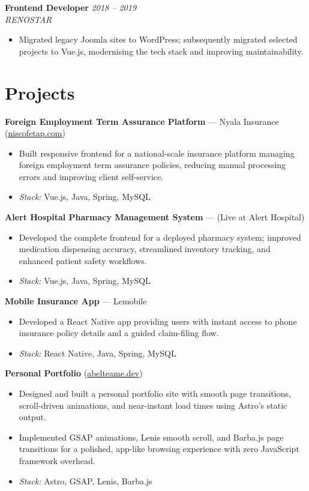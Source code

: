 \documentclass[10pt,a4paper]{article}
\begin{document}
\vspace{8pt}
\textbf{Frontend Developer} \hfill \textit{2018 -- 2019}\\
\textit{RENOSTAR}
\begin{itemize}
  \item Migrated legacy Joomla sites to WordPress; subsequently migrated selected projects to
        Vue.js, modernising the tech stack and improving maintainability.
\end{itemize}

\section{Projects}

\textbf{Foreign Employment Term Assurance Platform} --- Nyala Insurance
(\href{https://niscofetap.com}{niscofetap.com})
\begin{itemize}
  \item Built responsive frontend for a national-scale insurance platform managing foreign employment
        term assurance policies, reducing manual processing errors and improving client self-service.
  \item \textit{Stack:} Vue.js, Java, Spring, MySQL
\end{itemize}

\vspace{4pt}
\textbf{Alert Hospital Pharmacy Management System} --- (Live at Alert Hospital)
\begin{itemize}
  \item Developed the complete frontend for a deployed pharmacy system; improved medication dispensing
        accuracy, streamlined inventory tracking, and enhanced patient safety workflows.
  \item \textit{Stack:} Vue.js, Java, Spring, MySQL
\end{itemize}

\vspace{4pt}
\textbf{Mobile Insurance App} --- Lemobile
\begin{itemize}
  \item Developed a React Native app providing users with instant access to phone insurance policy
        details and a guided claim-filing flow.
  \item \textit{Stack:} React Native, Java, Spring, MySQL
\end{itemize}

\vspace{4pt}
\textbf{Personal Portfolio} (\href{https://abelteame.dev}{abelteame.dev})
\begin{itemize}
  \item Designed and built a personal portfolio site with smooth page transitions, scroll-driven
        animations, and near-instant load times using Astro's static output.
  \item Implemented GSAP animations, Lenis smooth scroll, and Barba.js page transitions for a
        polished, app-like browsing experience with zero JavaScript framework overhead.
  \item \textit{Stack:} Astro, GSAP, Lenis, Barba.js
\end{itemize}
\end{document}
